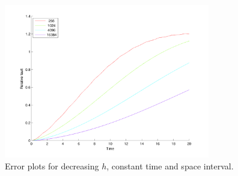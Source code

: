 \begin{figure}[h]
        \centering
        \includegraphics[width=0.8\textwidth]{gfx/erroroftime}
        \caption{Error plots for decreasing $h$, constant time and space interval.}
        \label{fig:erroroftime}
\end{figure}

